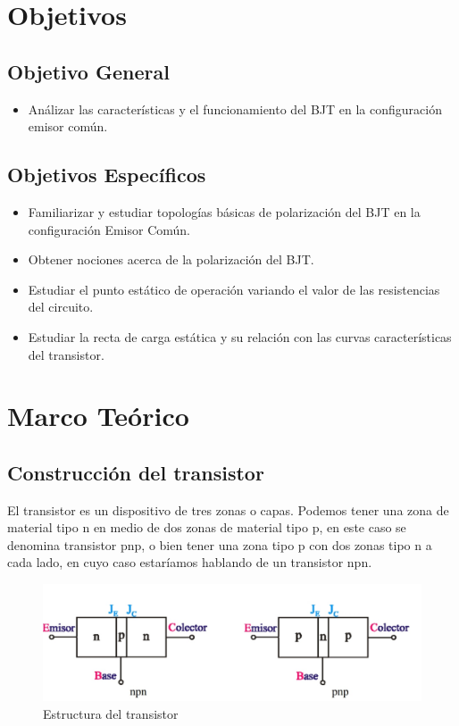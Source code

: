 \documentclass[10pt, a4paper]{article}
\begin{document}
    \newpage

    \section{Objetivos}

    \subsection{Objetivo General}
    \begin{itemize}
        \item Análizar las características y el funcionamiento del BJT en la configuración emisor común. 
    \end{itemize}

    \subsection{Objetivos Específicos}
    \begin{itemize}
        \item Familiarizar y estudiar topologías básicas de polarización del BJT en la configuración Emisor Común.
        \item Obtener nociones acerca de la polarización del BJT.
        \item Estudiar el punto estático de operación variando el valor de las resistencias del circuito.
        \item Estudiar la recta de carga estática y su relación con las curvas características del transistor.
    \end{itemize}

    \newpage

    \section{Marco Teórico}

    \subsection{Construcción del transistor}

    El transistor es un dispositivo de tres zonas o capas. Podemos tener una zona de material tipo n en medio de dos zonas de material tipo p, en este caso se denomina transistor pnp, o bien tener una zona tipo p con dos zonas tipo n a cada lado, en cuyo caso estaríamos hablando de un transistor npn.

    \begin{figure}[h!]
        \centering
        \includegraphics[height=4cm\textwidth]{construcion.jpg}
        \caption{\label{fig:1} Estructura del transistor }
    \end{figure}
\end{document}
